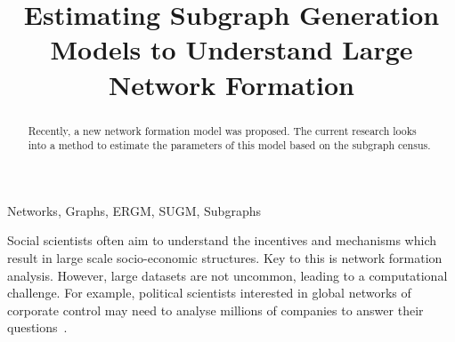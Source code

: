 \documentclass[conference]{IEEEtran}
\begin{document}
\title{Estimating Subgraph Generation Models to Understand Large Network Formation}

\author{
\and
{}
}

\maketitle

\begin{abstract}
Recently, a new network formation model was proposed. The current research looks into a method to estimate the parameters of this model based on the subgraph census.
\end{abstract}

\begin{IEEEkeywords}
Networks, Graphs, ERGM, SUGM, Subgraphs
\end{IEEEkeywords}

Social scientists often aim to understand the incentives and mechanisms which result in large scale socio-economic structures. Key to this is network formation analysis. However, large datasets are not uncommon, leading to a computational challenge. For example, political scientists interested in global networks of corporate control may need to analyse millions of companies to answer their questions~\cite{Takes2016,Fennema2018}.
\end{document}
